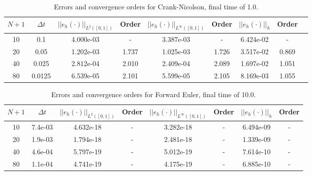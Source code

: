 \documentclass[a4paper, 12pt]{article}
\begin{document}
\begin{table}[H]
\caption{Errors and convergence orders for Crank-Nicolson, final time of 1.0.}
\vspace{0.1in}
\centering
\begin{tabular}{|c|c|c|c|c| c| c| c| c|}
\hline
 $N+1$  & $\Delta t$ &  $||e_h(\cdot)||_{L^2([0,1])}$ & Order  & $||e_h(\cdot)||_{L^\infty([0,1])}$ & Order& $||e_h(\cdot)||_h$& Order \\
 \hline           %
     10  & 0.1    & 4.000e-03 & -     & 3.387e-03 & -     & 6.424e-02 & -     \\
     20  & 0.05   & 1.202e-03 & 1.737 & 1.025e-03 & 1.726 & 3.517e-02 & 0.869 \\
     40  & 0.025  & 2.812e-04 & 2.010 & 2.409e-04 & 2.089 & 1.697e-02 & 1.051 \\
     80  & 0.0125 & 6.539e-05 & 2.101 & 5.599e-05 & 2.105 & 8.169e-03 & 1.055 \\
\hline
\end{tabular}
\label{tab:cnT1}
\end{table}

\begin{table}[H]
\caption{Errors and convergence orders for Forward Euler, final time of 10.0.}
\vspace{0.1in}
\centering
\begin{tabular}{|c|c|c|c| c| c| c| c|}
\hline
 $N+1$  & $\Delta t$  & $||e_h(\cdot)||_{L^2([0,1])}$ & Order  & $||e_h(\cdot)||_{L^\infty([0,1])}$ & Order& $||e_h(\cdot)||_h$& Order \\
 \hline            %
     10  & 7.4e-03 &  4.632e-18 & - & 3.282e-18 & - & 6.494e-09 & -\\
     20  & 1.9e-03 &  1.794e-18 & - & 2.481e-18 & - & 1.339e-09 & -\\
     40  & 4.6e-04 &  5.797e-19 & - & 5.012e-19 & - & 7.614e-10 & -\\
     80  & 1.1e-04 &  4.741e-19 & - & 4.175e-19 & - & 6.885e-10 & -\\
\hline
\end{tabular}
\label{tab:feT10}
\end{table}
\end{document}

